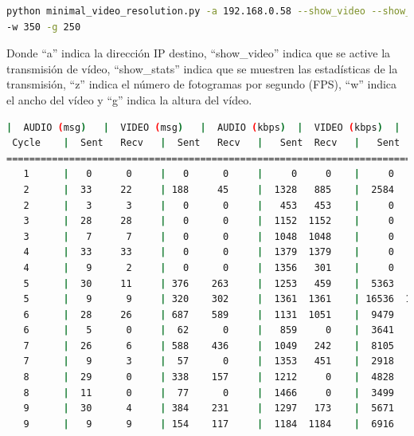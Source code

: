 \begin{lstlisting}[language=bash,basicstyle=\ttfamily\scriptsize]
python minimal_video_resolution.py -a 192.168.0.58 --show_video --show_stats -z 12 \\
-w 350 -g 250
\end{lstlisting}
Donde ``a'' indica la dirección IP destino, ``show\_video'' indica que se active la transmisión de vídeo, ``show\_stats'' indica que se muestren las estadísticas de la transmisión, ``z'' indica el número de fotogramas por segundo (FPS), ``w'' indica el ancho del vídeo y ``g'' indica la altura del vídeo.
\vspace{\baselineskip}

\begin{lstlisting}[language=bash,basicstyle=\ttfamily\scriptsize]
          |  AUDIO (msg)   |  VIDEO (msg)   |  AUDIO (kbps)  |  VIDEO (kbps)  |   CPU (%)
 Cycle    |  Sent   Recv   |  Sent   Recv   |   Sent  Recv   |   Sent  Recv   | Program System
============================================================================================
   1      |   0      0     |   0      0     |     0     0    |     0     0    |   0      0
   2      |  33     22     | 188     45     |  1328   885    |  2584    619   |  20     65
   2      |   3      3     |   0      0     |   453   453    |     0      0   |  13     68
   3      |  28     28     |   0      0     |  1152  1152    |     0      0   |  46     77
   3      |   7      7     |   0      0     |  1048  1048    |     0      0   |  31     76
   4      |  33     33     |   0      0     |  1379  1379    |     0      0   |  53     77
   4      |   9      2     |   0      0     |  1356   301    |     0      0   |  50     77
   5      |  30     11     | 376    263     |  1253   459    |  5363   3752   |  43     73
   5      |   9      9     | 320    302     |  1361  1361    | 16536  15593   |  36     74
   6      |  28     26     | 687    589     |  1131  1051    |  9479   8128   |  33     74
   6      |   5      0     |  62      0     |   859     0    |  3641      0   |  31     72
   7      |  26      6     | 588    436     |  1049   242    |  8105   6007   |  24     74
   7      |   9      3     |  57      0     |  1353   451    |  2918      0   |  41     73
   8      |  29      0     | 338    157     |  1212     0    |  4828   2240   |  43     72
   8      |  11      0     |  77      0     |  1466     0    |  3499      0   |  44     74
   9      |  30      4     | 384    231     |  1297   173    |  5671   3412   |  47     74
   9      |   9      9     | 154    117     |  1184  1184    |  6916   5262   |  44     74

\end{lstlisting}
